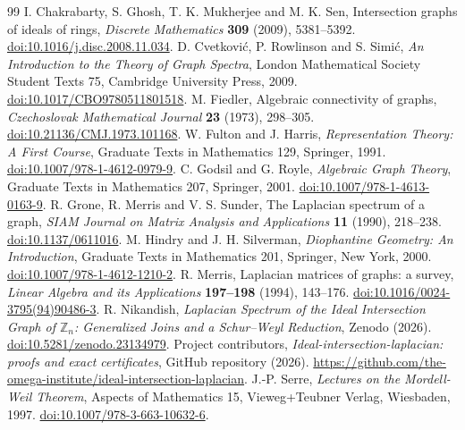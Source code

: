 \documentclass[11pt]{article}
\theoremstyle{remark}
\begin{document}
\begin{thebibliography}{99}
I. Chakrabarty, S. Ghosh, T. K. Mukherjee and M. K. Sen,
Intersection graphs of ideals of rings,
\emph{Discrete Mathematics} \textbf{309} (2009), 5381--5392.
\href{https://doi.org/10.1016/j.disc.2008.11.034}{doi:10.1016/j.disc.2008.11.034}.
D. Cvetkovi\'{c}, P. Rowlinson and S. Simi\'{c},
\emph{An Introduction to the Theory of Graph Spectra},
London Mathematical Society Student Texts 75, Cambridge University Press, 2009.
\href{https://doi.org/10.1017/CBO9780511801518}{doi:10.1017/CBO9780511801518}.
M. Fiedler, Algebraic connectivity of graphs,
\emph{Czechoslovak Mathematical Journal} \textbf{23} (1973), 298--305.
\href{https://doi.org/10.21136/CMJ.1973.101168}{doi:10.21136/CMJ.1973.101168}.
W. Fulton and J. Harris, \emph{Representation Theory: A First Course},
Graduate Texts in Mathematics 129, Springer, 1991.
\href{https://doi.org/10.1007/978-1-4612-0979-9}{doi:10.1007/978-1-4612-0979-9}.
C. Godsil and G. Royle, \emph{Algebraic Graph Theory},
Graduate Texts in Mathematics 207, Springer, 2001.
\href{https://doi.org/10.1007/978-1-4613-0163-9}{doi:10.1007/978-1-4613-0163-9}.
R. Grone, R. Merris and V. S. Sunder, The Laplacian spectrum of a graph,
\emph{SIAM Journal on Matrix Analysis and Applications} \textbf{11} (1990), 218--238.
\href{https://doi.org/10.1137/0611016}{doi:10.1137/0611016}.
M. Hindry and J. H. Silverman, \emph{Diophantine Geometry: An Introduction},
Graduate Texts in Mathematics 201, Springer, New York, 2000.
\href{https://doi.org/10.1007/978-1-4612-1210-2}{doi:10.1007/978-1-4612-1210-2}.
R. Merris, Laplacian matrices of graphs: a survey,
\emph{Linear Algebra and its Applications} \textbf{197--198} (1994), 143--176.
\href{https://doi.org/10.1016/0024-3795(94)90486-3}{doi:10.1016/0024-3795(94)90486-3}.
R. Nikandish,
\emph{Laplacian Spectrum of the Ideal Intersection Graph of $\mathbb Z_n$:
Generalized Joins and a Schur--Weyl Reduction}, Zenodo (2026).
\href{https://doi.org/10.5281/zenodo.23134979}{doi:10.5281/zenodo.23134979}.
Project contributors, \emph{Ideal-intersection-laplacian: proofs and exact certificates},
GitHub repository (2026).
\url{https://github.com/the-omega-institute/ideal-intersection-laplacian}.
J.-P. Serre, \emph{Lectures on the Mordell-Weil Theorem},
Aspects of Mathematics 15, Vieweg+Teubner Verlag, Wiesbaden, 1997.
\href{https://doi.org/10.1007/978-3-663-10632-6}{doi:10.1007/978-3-663-10632-6}.
\end{thebibliography}
\endgroup
\appendix



\clearpage

\clearpage

\end{document}
